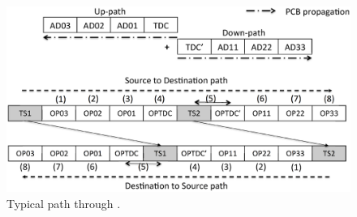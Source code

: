 \begin{figure}[h]
\centering
\includegraphics[width=.9\columnwidth]{./fig/nex_fwd1.eps}
\caption{Typical path through \ISDC.}\label{fig:ex-fwd-typical}
\end{figure}

